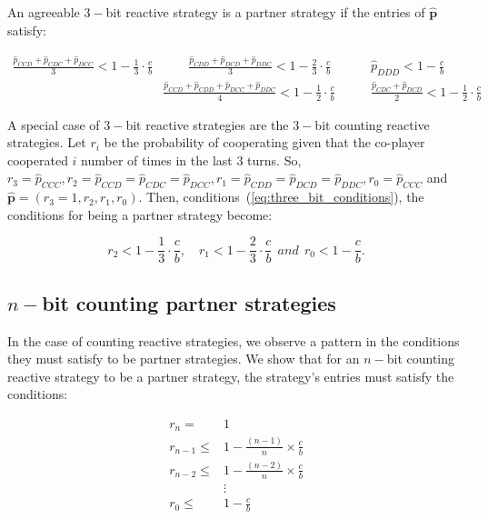 \documentclass{article}
\theoremstyle{definition}
\begin{document}
An agreeable $3-$bit reactive strategy is a partner strategy if the entries of
$\mathbf{\hat{p}}$ satisfy:

\begin{align}\label{eq:three_bit_conditions}
  \frac{\hat{p}_{CCD} + \hat{p}_{CDC} + \hat{p}_{DCC}}{3} < 1\!-\! \frac{1}{3} \cdot \frac{c}{b} & \qquad 
  \frac{\hat{p}_{CDD} + \hat{p}_{DCD} + \hat{p}_{DDC}}{3} < 1\!-\! \frac{2}{3} \cdot \frac{c}{b} & \qquad 
  \hat{p}_{DDD} < 1\!-\! \frac{c}{b} \\
  & \frac{\hat{p}_{CCD} + \hat{p}_{CDD} + \hat{p}_{DCC} + \hat{p}_{DDC}}{4}  < 1\!-\! \frac{1}{2} \cdot \frac{c}{b} 
  & \qquad \frac{\hat{p}_{CDC} + \hat{p}_{DCD}}{2} < 1\!-\! \frac{1}{2} \cdot \frac{c}{b}
\end{align}

A special case of $3-$bit reactive strategies are the $3-$bit counting reactive
strategies. Let $r_i$ be the probability of cooperating given that the co-player
cooperated $i$ number of times in the last 3 turns. So, $r_3 = \hat{p}_{CCC},
r_2 = \hat{p}_{CCD} =  \hat{p}_{CDC} = \hat{p}_{DCC}, r_1 = \hat{p}_{CDD} =
\hat{p}_{DCD} =  \hat{p}_{DDC}, r_0 = \hat{p}_{CCC}$ and $\mathbf{\hat{p}}=(r_3=1,
r_2, r_1, r_0)$. Then, conditions~(\ref{eq:three_bit_conditions}), the
conditions for being a partner strategy become:

\begin{equation}\label{eq:counting_three_bit_conditions}
  \displaystyle r_2 < 1- \frac{1}{3} \cdot \frac{c}{b}, \quad r_1 < 1- \frac{2}{3} \cdot \frac{c}{b} ~~and~~ r_0 < 1\!-\! \frac{c}{b}.
\end{equation}


\subsection{$n-$bit counting partner strategies}

In the case of counting reactive strategies, we observe a pattern in the
conditions they must satisfy to be partner strategies. We show that for an $n-$bit
counting reactive strategy to be a partner strategy, the strategy's entries must
satisfy the conditions:

\begin{align*}
    r_{n}   = & 1 \\
    r_{n-1} \leq & 1  - \frac{(n - 1)}{n} \times \frac{c}{b}\\
    r_{n-2} \leq & 1  - \frac{(n - 2)}{n} \times \frac{c}{b}\\
    & \vdots \\
    r_{0} \leq &  1  - \frac{c}{b}\\
\end{align*}
\end{document}

